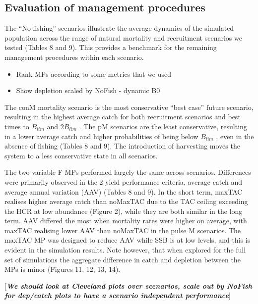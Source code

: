 \documentclass[12pt,]{article}
\providecommand{\tightlist}{%
  \setlength{\itemsep}{0pt}\setlength{\parskip}{0pt}}
\begin{document}
\subsection{Evaluation of management
procedures}\label{evaluation-of-management-procedures}

The ``No-fishing'' scenarios illustrate the average dynamics of the
simulated population across the range of natural mortality and
recruitment scenarios we tested (Tables 8 and 9). This provides a
benchmark for the remaining management procedures within each scenario.

\begin{itemize}
\tightlist
\item
  Rank MPs according to some metrics that we used
\item
  Show depletion scaled by NoFish - dynamic B0
\end{itemize}

The conM mortality scenario is the most conservative ``best case''
future scenario, resulting in the highest average catch for both
recruitment scenarios and best times to \(B_{lim}\) and \(2 B_{lim}\) .
The pM scenarios are the least conservative, resulting in a lower
average catch and higher probabilities of being below \(B_{lim}\) , even
in the absence of fishing (Tables 8 and 9). The introduction of
harvesting moves the system to a less conservative state in all
scenarios.

The two variable F MPs performed largely the same across scenarios.
Differences were primarily observed in the 2 yield performance criteria,
average catch and average annual variation (AAV) (Tables 8 and 9). In
the short term, maxTAC realises higher average catch than noMaxTAC due
to the TAC ceiling exceeding the HCR at low abundance (Figure 2), while
they are both similar in the long term. AAV differed the most when
mortality rates were higher on average, with maxTAC realising lower AAV
than noMaxTAC in the pulse M scenarios. The maxTAC MP was designed to
reduce AAV while SSB is at low levels, and this is evident in the
simulation results. Note however, that when explored for the full set of
simulations the aggregate difference in catch and depletion between the
MPs is minor (Figures 11, 12, 13, 14).

{[}\textbf{\emph{We should look at Cleveland plots over scenarios, scale
out by NoFish for dep/catch plots to have a scenario independent
performance}}{]}
\end{document}
